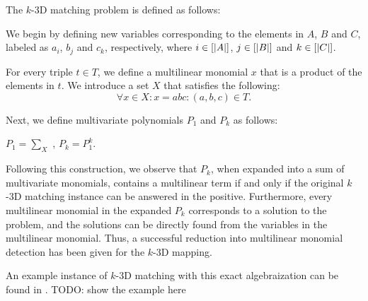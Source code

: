 The $k$-3D matching problem is defined as follows:

\begin{problem}
\end{problem}

We begin by defining new variables corresponding to the elements in $A$, $B$ and $C$, 
labeled as $a_i$, $b_j$ and $c_k$, respectively, where $i\in [{\left\vert A\right\vert}]$, $j\in
[{\left\vert B\right\vert}]$ and $k\in [{\left\vert C\right\vert}]$. 

For every triple $t \in T$, we define a multilinear monomial $x$ that is a
product of the elements in $t$. 
We introduce a set $X$ that satisfies the following:
\[
\forall x \in X: x = abc : (a, b, c) \in T.
\]

Next, we define multivariate polynomials $P_1$ and $P_k$ as follows:
\begin{center}$P_1 = \displaystyle \sum_{X}$ ,   $P_k = P_1^k$.\end{center}

Following this construction, we observe that $P_k$, when expanded into a sum of multivariate monomials, 
contains a multilinear term if and only if the original $k$-3D matching instance can be answered in the positive. 
Furthermore, every multilinear monomial in the expanded $P_k$ corresponds to a solution to the problem, and 
the solutions can be directly found from the variables in the multilinear monomial. Thus, 
a successful reduction into multilinear monomial detection has been given for the $k$-3D mapping.

An example instance of $k$-3D matching with this exact algebraization can be found in \cite{KouWil15}. 
TODO: show the example here
\clearpage
